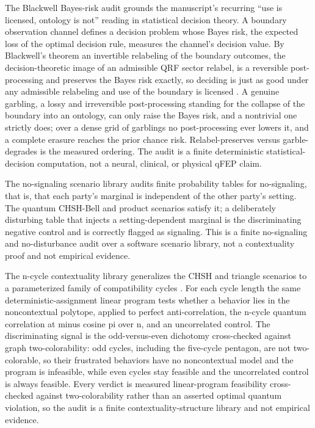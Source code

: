 \documentclass[
]{article}
\begin{document}
The Blackwell Bayes-risk audit grounds the manuscript's recurring ``use
is licensed, ontology is not'' reading in statistical decision theory. A
boundary observation channel defines a decision problem whose Bayes
risk, the expected loss of the optimal decision rule, measures the
channel's decision value. By Blackwell's theorem an invertible
relabeling of the boundary outcomes, the decision-theoretic image of an
admissible QRF sector relabel, is a reversible post-processing and
preserves the Bayes risk exactly, so deciding is just as good under any
admissible relabeling and use of the boundary is licensed
\citep{blackwell1953equivalent}. A genuine garbling, a lossy and
irreversible post-processing standing for the collapse of the boundary
into an ontology, can only raise the Bayes risk, and a nontrivial one
strictly does; over a dense grid of garblings no post-processing ever
lowers it, and a complete erasure reaches the prior chance risk.
Relabel-preserves versus garble-degrades is the measured ordering. The
audit is a finite deterministic statistical-decision computation, not a
neural, clinical, or physical qFEP claim.

The no-signaling scenario library audits finite probability tables for
no-signaling, that is, that each party's marginal is independent of the
other party's setting. The quantum CHSH-Bell and product scenarios
satisfy it; a deliberately disturbing table that injects a
setting-dependent marginal is the discriminating negative control and is
correctly flagged as signaling. This is a finite no-signaling and
no-disturbance audit over a software scenario library, not a
contextuality proof and not empirical evidence.

The n-cycle contextuality library generalizes the CHSH and triangle
scenarios to a parameterized family of compatibility cycles
\citep{araujo2013ncycle}. For each cycle length the same
deterministic-assignment linear program tests whether a behavior lies in
the noncontextual polytope, applied to perfect anti-correlation, the
n-cycle quantum correlation at minus cosine pi over n, and an
uncorrelated control. The discriminating signal is the odd-versus-even
dichotomy cross-checked against graph two-colorability: odd cycles,
including the five-cycle pentagon, are not two-colorable, so their
frustrated behaviors have no noncontextual model and the program is
infeasible, while even cycles stay feasible and the uncorrelated control
is always feasible. Every verdict is measured linear-program feasibility
cross-checked against two-colorability rather than an asserted optimal
quantum violation, so the audit is a finite contextuality-structure
library and not empirical evidence.
\end{document}
